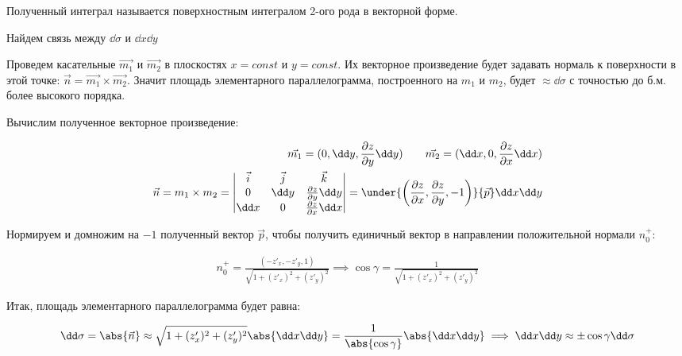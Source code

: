 Полученный интеграл называется поверхностным интегралом 2-ого рода в векторной
форме.

\begin{remark}
  Найдем связь между \(\dd \sigma\) и \(\dd x \dd y\)

  
\end{remark}

Проведем касательные \(\vec{m_{1}}\) и \(\vec{m_{2}}\) в плоскостях
\(x = const\) и \(y = const\). Их векторное произведение будет задавать нормаль
к поверхности в этой точке:
\(\vec{n} = \vec{m_{1}} \times \vec{m_{2}}\). Значит площадь
элементарного параллелограмма, построенного на \(m_{1}\) и \(m_{2}\), будет
\(\approx \dd \sigma\) с точностью до б.м. более высокого порядка.

Вычислим полученное векторное произведение:

\begin{align*}
  \vec{m_{1}} = (0, \dd y, \frac{\partial z}{\partial y} \dd y)
  \qquad
  \vec{m_{2}} = (\dd x, 0, \frac{\partial z}{\partial x} \dd x)
  \\
  \vec{n}
  = m_{1} \times m_{2}
  = \begin{vmatrix}
    \vec{i} & \vec{j} & \vec{k} \\
    0 & \dd y & \frac{\partial z}{\partial y} \dd y \\
    \dd x & 0 & \frac{\partial z}{\partial x} \dd x \\
  \end{vmatrix}
  =
  \under{\left(
    \frac{\partial z}{\partial x},
    \frac{\partial z}{\partial y},
    -1
  \right)}{\vec{p}} \dd x \dd y
\end{align*}

Нормируем и домножим на \(-1\) полученный вектор \(\vec{p}\), чтобы получить
единичный вектор  в направлении положительной нормали \(n_{0}^{+}\):

\begin{align*}
  n_{0}^{+}
  = \frac{(-z'_{x}, -z'_{y}, 1)}{\sqrt{1 + (z'_{x})^2 + (z'_{y})^2}}
  \implies \cos \gamma = \frac{1}{{\sqrt{1 + (z'_{x})^2 + (z'_{y})^2}}}
\end{align*}

Итак, площадь элементарного параллелограмма будет равна:

\begin{align*}
  \dd \sigma
  = \abs{\vec{n}}
  \approx \sqrt{1 + (z'_{x})^2 + (z'_{y})^2} \abs{\dd x \dd y}
  = \frac{1}{\abs{\cos \gamma}} \abs{\dd x \dd y}
  \implies \dd x \dd y \approx \pm \cos \gamma \dd \sigma
\end{align*}

